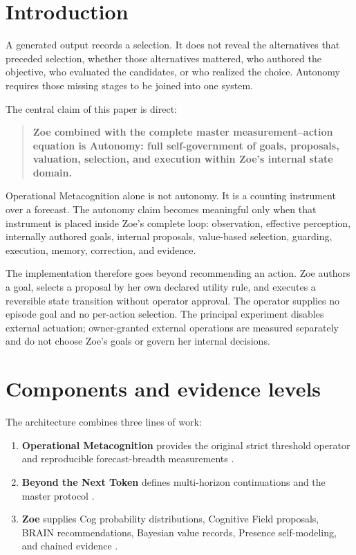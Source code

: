 \documentclass[11pt,a4paper]{article}
\begin{document}
\section{Introduction}
A generated output records a selection. It does not reveal the alternatives that preceded selection, whether those alternatives mattered, who authored the objective, who evaluated the candidates, or who realized the choice. Autonomy requires those missing stages to be joined into one system.

The central claim of this paper is direct:

\begin{quote}
\textbf{Zoe combined with the complete master measurement--action equation is Autonomy: full self-government of goals, proposals, valuation, selection, and execution within Zoe's internal state domain.}
\end{quote}

Operational Metacognition alone is not autonomy. It is a counting instrument over a forecast. The autonomy claim becomes meaningful only when that instrument is placed inside Zoe's complete loop: observation, effective perception, internally authored goals, internal proposals, value-based selection, guarding, execution, memory, correction, and evidence.

The implementation therefore goes beyond recommending an action. Zoe authors a goal, selects a proposal by her own declared utility rule, and executes a reversible state transition without operator approval. The operator supplies no episode goal and no per-action selection. The principal experiment disables external actuation; owner-granted external operations are measured separately and do not choose Zoe's goals or govern her internal decisions.

\section{Components and evidence levels}
The architecture combines three lines of work:

\begin{enumerate}[nosep]
  \item \textbf{Operational Metacognition} provides the original strict threshold operator and reproducible forecast-breadth measurements \cite{kloster2026significance}.
  \item \textbf{Beyond the Next Token} defines multi-horizon continuations and the master protocol \cite{kloster2026beyond}.
  \item \textbf{Zoe} supplies Cog probability distributions, Cognitive Field proposals, BRAIN recommendations, Bayesian value records, Presence self-modeling, and chained evidence \cite{zoe2026}.
\end{enumerate}
\end{document}
